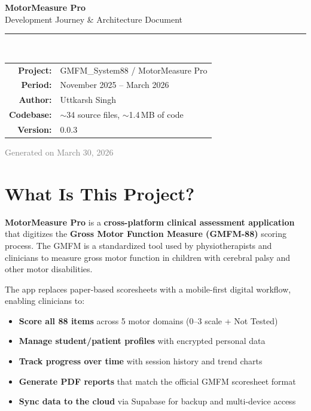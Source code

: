\documentclass[12pt,a4paper]{article}
\begin{document}
\begin{titlepage}
\centering
\vspace*{3cm}

{\Huge\bfseries\textcolor{darkbg}{MotorMeasure Pro}}\\[0.5cm]
{\Large\textcolor{primaryteal}{Development Journey \& Architecture Document}}\\[2cm]

\textcolor{primaryteal}{\rule{0.6\textwidth}{2pt}}\\[1.5cm]

\begin{tabular}{rl}
    \textbf{Project:}     & GMFM\_System88 / MotorMeasure Pro \\[0.3cm]
    \textbf{Period:}      & November 2025 -- March 2026 \\[0.3cm]
    \textbf{Author:}      & Uttkarsh Singh \\[0.3cm]
    \textbf{Codebase:}    & $\sim$34 source files, $\sim$1.4\,MB of code \\[0.3cm]
    \textbf{Version:}     & 0.0.3 \\
\end{tabular}

\vfill
{\small\textcolor{gray}{Generated on March 30, 2026}}
\end{titlepage}

\tableofcontents
\newpage

\section{What Is This Project?}

\textbf{MotorMeasure Pro} is a \textbf{cross-platform clinical assessment application} that digitizes the \textbf{Gross Motor Function Measure (GMFM-88)} scoring process. The GMFM is a standardized tool used by physiotherapists and clinicians to measure gross motor function in children with cerebral palsy and other motor disabilities.

The app replaces paper-based scoresheets with a mobile-first digital workflow, enabling clinicians to:

\begin{itemize}[leftmargin=2em]
    \item \textbf{Score all 88 items} across 5 motor domains (0--3 scale + Not Tested)
    \item \textbf{Manage student/patient profiles} with encrypted personal data
    \item \textbf{Track progress over time} with session history and trend charts
    \item \textbf{Generate PDF reports} that match the official GMFM scoresheet format
    \item \textbf{Sync data to the cloud} via Supabase for backup and multi-device access
\end{itemize}
\end{document}
